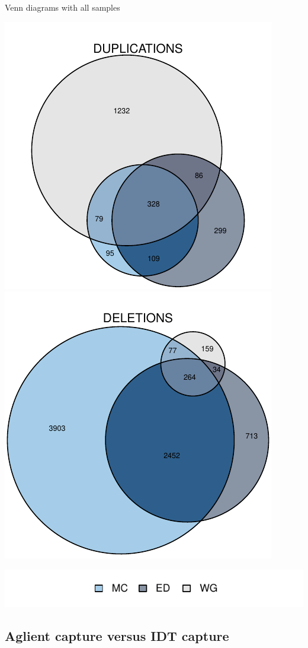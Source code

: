 \documentclass[
  10pt,
  ignorenonframetext,
  m]{beamer}
\begin{document}
\begin{frame}{Venn diagrams with all samples}

\begin{center}\includegraphics[width=0.49\linewidth]{defense_files/figure-beamer/vennAll-1} \includegraphics[width=0.49\linewidth]{defense_files/figure-beamer/vennAll-2} \end{center}

\centering \includegraphics{defense_files/figure-beamer/vennLgnd-1.pdf}

\end{frame}

\hypertarget{aglient-capture-versus-idt-capture}{%
\subsection{Aglient capture versus IDT
capture}\label{aglient-capture-versus-idt-capture}}
\end{document}
